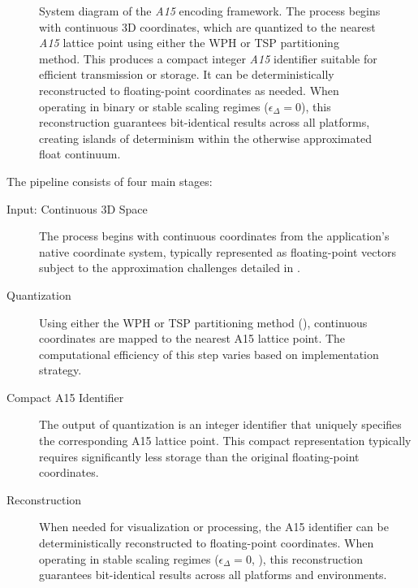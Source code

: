 \documentclass[10pt]{article}
\def\AAAB{\textit{A15}}
\begin{document}
\begin{figure}[!ht]
    \caption{System diagram of the \AAAB{} encoding framework. The process begins with continuous 3D coordinates, which are quantized to the nearest \AAAB{} lattice point using either the WPH or TSP partitioning method. This produces a compact integer \AAAB{} identifier suitable for efficient transmission or storage. It can be deterministically reconstructed to floating-point coordinates as needed. When operating in binary or stable scaling regimes ($\epsilon_\Delta = 0$), this reconstruction guarantees bit-identical results across all platforms, creating islands of determinism within the otherwise approximated float continuum.}
    \label{fig-system-diagram}
\end{figure}

The pipeline consists of four main stages:

\begin{description}
    \item[Input: Continuous 3D Space] The process begins with continuous coordinates from the application's native coordinate system, typically represented as floating-point vectors subject to the approximation challenges detailed in .

    \item[Quantization] Using either the WPH or TSP partitioning method (), continuous coordinates are mapped to the nearest A15 lattice point. The computational efficiency of this step varies based on implementation strategy.

    \item[Compact A15 Identifier] The output of quantization is an integer identifier that uniquely specifies the corresponding A15 lattice point. This compact representation typically requires significantly less storage than the original floating-point coordinates.

    \item[Reconstruction] When needed for visualization or processing, the A15 identifier can be deterministically reconstructed to floating-point coordinates. When operating in stable scaling regimes ($\epsilon_\Delta = 0$, ), this reconstruction guarantees bit-identical results across all platforms and environments.
\end{description}
\end{document}
